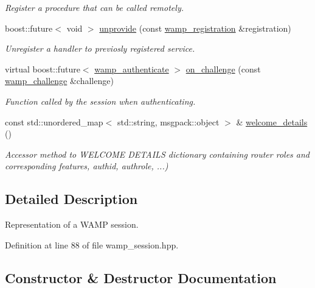 \begin{DoxyCompactItemize}
\begin{DoxyCompactList}\small\item\em Register a procedure that can be called remotely. \end{DoxyCompactList}\item 
boost\+::future$<$ void $>$ \hyperlink{classautobahn_1_1wamp__session_a029fdfb68ea7a2b31b5aaa6d7cce50d8}{unprovide} (const \hyperlink{classautobahn_1_1wamp__registration}{wamp\+\_\+registration} \&registration)
\begin{DoxyCompactList}\small\item\em Unregister a handler to previosly registered service. \end{DoxyCompactList}\item 
virtual boost\+::future$<$ \hyperlink{classautobahn_1_1wamp__authenticate}{wamp\+\_\+authenticate} $>$ \hyperlink{classautobahn_1_1wamp__session_ae48991590eed7b9d26b34c6d0a7928a0}{on\+\_\+challenge} (const \hyperlink{classautobahn_1_1wamp__challenge}{wamp\+\_\+challenge} \&challenge)
\begin{DoxyCompactList}\small\item\em Function called by the session when authenticating. \end{DoxyCompactList}\item 
const std\+::unordered\+\_\+map$<$ std\+::string, msgpack\+::object $>$ \& \hyperlink{classautobahn_1_1wamp__session_a80c666e67c8f82688cb4cf554b4b317b}{welcome\+\_\+details} ()
\begin{DoxyCompactList}\small\item\em Accessor method to W\+E\+L\+C\+O\+ME D\+E\+T\+A\+I\+LS dictionary containing router roles and corresponding features, authid, authrole, ...) \end{DoxyCompactList}\end{DoxyCompactItemize}


\subsection{Detailed Description}
Representation of a W\+A\+MP session. 

Definition at line 88 of file wamp\+\_\+session.\+hpp.



\subsection{Constructor \& Destructor Documentation}
